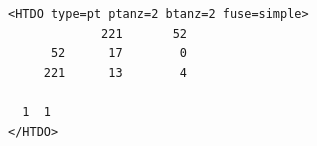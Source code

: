 \begin{verbatim}
<HTDO type=pt ptanz=2 btanz=2 fuse=simple>
             221       52 
      52      17        0 
     221      13        4 

  1  1
</HTDO>
\end{verbatim}
